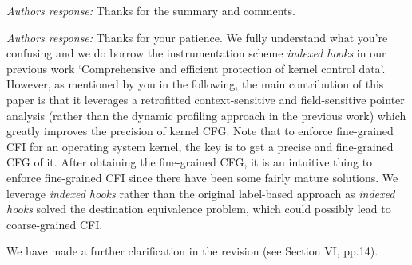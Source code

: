 \documentclass[oneside, 11pt]{article}
\begin{document}
{\em Authors response:}
Thanks for the summary and comments.


\smallskip
\smallskip
\smallskip
{}

{\em Authors response:}
Thanks for your patience. We fully understand what you're confusing
and we do borrow the instrumentation scheme \emph{indexed hooks} in our
previous work `Comprehensive and efficient protection of kernel control
data'. However, as mentioned by you in the following, the main contribution
of this paper is that it leverages a retrofitted context-sensitive and
field-sensitive pointer analysis (rather than the dynamic profiling approach
in the previous work) which greatly improves the precision of
kernel CFG. Note that to enforce fine-grained CFI for an operating system
kernel, the key is to get a precise and fine-grained CFG of it.
After obtaining the fine-grained CFG, it is an intuitive thing to
enforce fine-grained CFI since there have been some fairly mature
solutions. We leverage \emph{indexed hooks} rather than the original label-based
approach as \emph{indexed hooks} solved the destination equivalence problem, which
could possibly lead to coarse-grained CFI.

We have made a further clarification in the revision (see Section VI, pp.14).




\smallskip
\smallskip
\smallskip
{}
\end{document}
